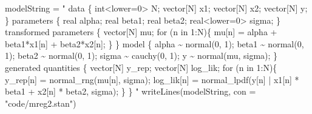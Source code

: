 \documentclass[
  11pt,
]{krantz}
\makeatletter
\newenvironment{Shaded}{\begin{snugshade}}{\end{snugshade}}
\newcommand{\AttributeTok}[1]{\textcolor[rgb]{0.61,0.61,0.61}{#1}}
\newcommand{\DecValTok}[1]{\textcolor[rgb]{0.06,0.06,0.06}{#1}}
\newcommand{\FunctionTok}[1]{\textcolor[rgb]{0,0,0}{#1}}
\newcommand{\NormalTok}[1]{#1}
\newcommand{\OtherTok}[1]{\textcolor[rgb]{0.37,0.37,0.37}{#1}}
\newcommand{\SpecialCharTok}[1]{\textcolor[rgb]{0,0,0}{#1}}
\newcommand{\StringTok}[1]{\textcolor[rgb]{0.5,0.5,0.5}{#1}}
\newenvironment{kframe}{%
\medskip{}
\setlength{\fboxsep}{.8em}
 \def\at@end@of@kframe{}%
 \ifinner\ifhmode%
  \def\at@end@of@kframe{\end{minipage}}%
  \begin{minipage}{\columnwidth}%
 \fi\fi%
 \def\FrameCommand##1{\hskip\@totalleftmargin \hskip-\fboxsep
 \colorbox{shadecolor}{##1}\hskip-\fboxsep
     \hskip-\linewidth \hskip-\@totalleftmargin \hskip\columnwidth}%
 \MakeFramed {\advance\hsize-\width
   \@totalleftmargin\z@ \linewidth\hsize
   \@setminipage}}%
 {\par\unskip\endMakeFramed%
 \at@end@of@kframe}
\renewenvironment{Shaded}{\begin{kframe}}{\end{kframe}}
\theoremstyle{definition}
\theoremstyle{definition}
\theoremstyle{definition}
\theoremstyle{definition}
\theoremstyle{remark}
\makeatother
\begin{document}
\begin{Shaded}
\begin{Highlighting}[]
\NormalTok{modelString }\OtherTok{=} \StringTok{"}
\StringTok{data \{}
\StringTok{  int\textless{}lower=0\textgreater{} N;}
\StringTok{  vector[N] x1;}
\StringTok{  vector[N] x2;}
\StringTok{  vector[N] y;}
\StringTok{\}}
\StringTok{parameters \{}
\StringTok{  real alpha;}
\StringTok{  real beta1;}
\StringTok{  real beta2;}
\StringTok{  real\textless{}lower=0\textgreater{} sigma;}
\StringTok{\}}
\StringTok{transformed parameters \{}
\StringTok{  vector[N] mu;}
\StringTok{  for (n in 1:N)\{}
\StringTok{    mu[n] = alpha + beta1*x1[n] + beta2*x2[n];}
\StringTok{  \}}
\StringTok{\}}
\StringTok{model \{}
\StringTok{  alpha \textasciitilde{} normal(0, 1);}
\StringTok{  beta1 \textasciitilde{} normal(0, 1);}
\StringTok{  beta2 \textasciitilde{} normal(0, 1);}
\StringTok{  sigma \textasciitilde{} cauchy(0, 1);}
\StringTok{  y \textasciitilde{} normal(mu, sigma);}
\StringTok{\}}
\StringTok{generated quantities \{}
\StringTok{  vector[N] y\_rep;}
\StringTok{  vector[N] log\_lik;}
\StringTok{  for (n in 1:N)\{}
\StringTok{    y\_rep[n] = normal\_rng(mu[n], sigma);}
\StringTok{    log\_lik[n] = normal\_lpdf(y[n] | x1[n] * beta1 + x2[n] * beta2, sigma);}
\StringTok{  \}}
\StringTok{\}}
\StringTok{"}
\FunctionTok{writeLines}\NormalTok{(modelString, }\AttributeTok{con =} \StringTok{"code/mreg2.stan"}\NormalTok{)}
\end{Highlighting}
\end{Shaded}

\begin{Shaded}
\end{Shaded}

\begin{Shaded}
\end{Shaded}
\end{document}
